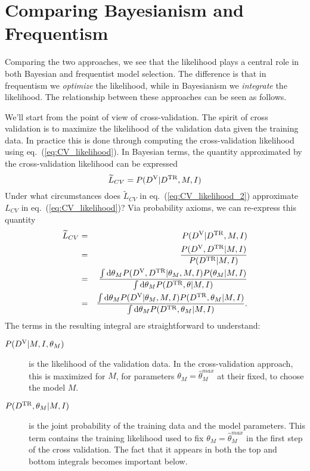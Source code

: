 \documentclass[12pt,pdftex]{article}
\newcommand{\dd}{\mathrm{d}}
\newcommand{\Dtr}{\ensuremath{D^{\rm TR}}}
\newcommand{\Dva}{\ensuremath{D^{\rm V}}}
\newcommand{\eqn}[1]{eq.~(\ref{eq:#1})}
\begin{document}
\section{Comparing Bayesianism and Frequentism}
Comparing the two approaches, we see that the likelihood plays a central
role in both Bayesian and frequentist model selection.  The difference
is that in frequentism we {\it optimize} the likelihood, while in
Bayesianism we {\it integrate} the likelihood.  The relationship between
these approaches can be seen as follows.

We'll start from the point of view of cross-validation.  The spirit of cross
validation is to maximize the likelihood of the validation data given the
training data.  In practice this is done through computing the cross-validation
likelihood using \eqn{CV_likelihood}.  In Bayesian terms, the quantity
approximated by the cross-validation likelihood can be expressed
\begin{equation}
  \label{eq:CV_likelihood_2}
  \widetilde{L}_{CV} = P(\Dva|\Dtr,M,I)
\end{equation}
Under what circumstances does $\widetilde{L}_{CV}$ in \eqn{CV_likelihood_2}
approximate ${L}_{CV}$ in \eqn{CV_likelihood}?  Via probability axioms,
we can re-express this quantity
\begin{eqnarray}
  \label{eq:LCV_derivation}
  \widetilde{L}_{CV} &=& P(\Dva|\Dtr,M,I)\nonumber\\
                    &=& \frac{P(\Dva, \Dtr|M,I)}{P(\Dtr|M,I)}\nonumber\\
                    &=& \frac{\int \dd\theta_M P(\Dva, \Dtr|\theta_M,M,I)
                                               P(\theta_M|M,I)}
                             {\int \dd\theta_M P(\Dtr, \theta|M,I)}\nonumber\\
                    &=& \frac{\int \dd\theta_M P(\Dva|\theta_M,M,I)
                                               P(\Dtr, \theta_M|M,I)}
                             {\int \dd\theta_M P(\Dtr, \theta_M|M,I)}.
\end{eqnarray}
The terms in the resulting integral are straightforward to understand:
\begin{description}
  \item[$P(\Dva|M, I, \theta_M)$] is the likelihood of the validation
    data.  In the cross-validation approach, this is maximized for $M$,
    for parameters $\theta_M = \hat{\theta}^{max}_M$ at their fixed, to choose
    the model $M$.
  \item[$P(\Dtr,\theta_M|M, I)$] is the joint probability of the training data
    and the model parameters.  This term contains the training likelihood used
    to fix  $\theta_M = \hat{\theta}^{max}_M$ in the first step of the cross
    validation.  The fact that it appears in both the top and bottom integrals
    becomes important below.
\end{description}
\end{document}
